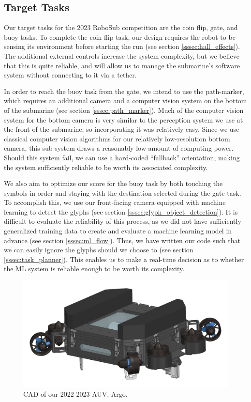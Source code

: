 \documentclass[conference]{IEEEtran}
\begin{document}
\subsection{Target Tasks}
\label{ssec:target_goals}
Our target tasks for the 2023 RoboSub competition are the coin flip, gate, and buoy tasks. To complete the coin flip task, our design requires the robot to be sensing its environment before starting the run (see section \ref{sssec:hall_effects}). The additional external controls increase the system complexity, but we believe that this is quite reliable, and will allow us to manage the submarine's software system without connecting to it via a tether.

\break

In order to reach the buoy task from the gate, we intend to use the path-marker, which requires an additional camera and a computer vision system on the bottom of the submarine (see section \ref{sssec:path_marker}). Much of the computer vision system for the bottom camera is very similar to the perception system we use at the front of the submarine, so incorporating it was relatively easy. Since we use classical computer vision algorithms for our relatively low-resolution bottom camera, this sub-system draws a reasonably low amount of computing power. Should this system fail, we can use a hard-coded “fallback” orientation, making the system sufficiently reliable to be worth its associated complexity. 

We also aim to optimize our score for the buoy task by both touching the symbols in order and staying with the destination selected during the gate task. To accomplish this, we use our front-facing camera equipped with machine learning to detect the glyphs (see section \ref{sssec:glyph_object_detection}). It is difficult to evaluate the reliability of this process, as we did not have sufficiently generalized training data to create and evaluate a machine learning model in advance (see section \ref{sssec:ml_flow}). Thus, we have written our code such that we can easily ignore the glyphs should we choose to (see section \ref{sssec:task_planner}). This enables us to make a real-time decision as to whether the ML system is reliable enough to be worth its complexity.

\begin{figure}
    \centerline{\includegraphics[scale=0.35]{images/Isometric_foam.PNG}}
    \caption{CAD of our 2022-2023 AUV, Argo.}
    \label{fig:sub4}
\end{figure}
\end{document}
